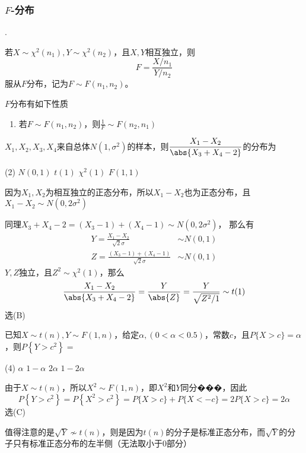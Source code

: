 \subsubsection{\texorpdfstring{$F$}{F}-分布}
.
\begin{definition}
    若$X\sim \chi^2(n_1), Y\sim\chi^2(n_2)$，且$X,Y$相互独立，则
    \[ F=\frac{X/n_1}{Y/n_2} \]
    服从$F$分布，记为$F\sim F(n_1,n_2)$。
\end{definition}
$F$分布有如下性质
\begin{enumerate}[(1)]
    \item 若$F\sim F(n_1,n_2)$，则$\frac{1}{F} \sim F(n_2,n_1)$
\end{enumerate}


\begin{example}
    $X_1,X_2,X_3,X_4$来自总体$N(1,\sigma^2)$的样本，则$\dfrac{X_1-X_2}{\abs{X_3+X_4-2}}$的分布为
    \begin{tasks}[label=(\Alph*),label-width = 2em](2)
        \task $N(0,1)$
        \task $t(1)$
        \task $\chi^2(1)$
        \task $F(1,1)$
    \end{tasks}
\end{example}
\begin{solution}
    因为$X_1,X_2$为相互独立的正态分布，所以$X_1-X_2$也为正态分布，且$X_1-X_2 \sim N(0,2\sigma^2)$

    同理$X_3+X_4-2 = (X_3-1) + (X_4-1) \sim N(0,2\sigma^2)$，
    那么有
    \begin{align*}
        Y = \frac{X_1-X_2}{\sqrt{2}\sigma}          & \sim N(0,1) \\
        Z =\frac{(X_3-1) + (X_4-1)}{\sqrt{2}\sigma} & \sim N(0,1)
    \end{align*}
    $Y,Z$独立，且$Z^2 \sim \chi^2(1)$，那么
    \[ \frac{X_1-X_2}{\abs{X_3+X_4-2}} = \frac{Y}{\abs{Z}} = \frac{Y}{\sqrt{Z^2/1}} \sim t(1) \]
    选(B)
\end{solution}

\begin{example}
    已知$X\sim t(n), Y\sim F(1,n)$，给定$\alpha, (0<\alpha<0.5)$，常数$c$，且$P\{X>c\}=\alpha$，则$P\left\{Y>c^2\right\}=$
    \begin{tasks}[label=(\Alph*),label-width = 2em](4)
        \task $\alpha$
        \task $1-\alpha$
        \task $2\alpha$
        \task $1-2\alpha$
    \end{tasks}
\end{example}
\begin{solution}
    由于$X\sim t(n)$，所以$X^2 \sim F(1,n)$，即$X^2$和$Y$同分���，因此
    \[ P\left\{ Y > c^2 \right\} = P\left\{ X^2 > c^2 \right\} = P\{ X>c \}+P\{X < -c\} = 2P\{X>c\} = 2\alpha \]
    选(C)

    值得注意的是$\sqrt{Y} \not\sim t(n)$，则是因为$t(n)$的分子是标准正态分布，而$\sqrt{Y}$的分子只有标准正态分布的左半侧（无法取小于$0$部分）
\end{solution}

